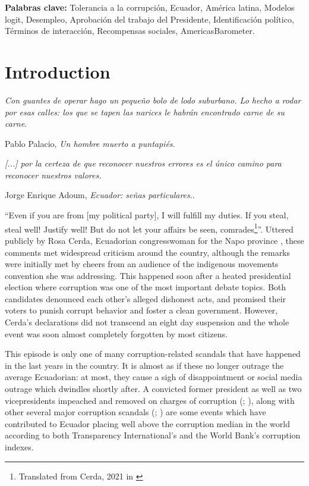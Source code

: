 \documentclass[12pt,a4]{article}\usepackage[]{graphicx}\usepackage[]{xcolor}
\begin{document}
\noindent \textbf{Palabras clave:} Tolerancia a la corrupción, Ecuador, América latina, Modelos logit, Desempleo, Aprobación del trabajo del Presidente, Identificación político, Términos de interacción, Recompensas sociales, AmericasBarometer. 





\section{Introduction}

\epigraph{\textit{Con guantes de operar hago un pequeño bolo de lodo suburbano. Lo hecho a rodar por esas calles: los que se tapen las narices le habrán encontrado carne de su carne}.}{Pablo Palacio, \textit{Un hombre muerto a puntapiés}.} \nocite{Palacio.2018}
\vspace{-0.8cm}
\epigraph{\textit{[...] por la certeza de que reconocer nuestros errores es el único camino para reconocer nuestros valores.}}{Jorge Enrique Adoum, \textit{Ecuador: señas particulares}..}

\enquote{Even if you are from [my political party], I will fulfill my duties. If you steal, steal well!  Justify well! But do not let your affairs be seen, comrades\footnote{Translated from Cerda, 2021 in \cite[para. 2]{PlanV.2021}}}. Uttered publicly by Rosa Cerda, Ecuadorian congresswoman for the Napo province \parencite{Castro.2021}, these comments met widespread criticism around the country, although the remarks were initially met by cheers from an audience of the indigenous movements convention she was addressing. This happened soon after a heated presidential election where corruption was one of the most important debate topics. Both candidates denounced each other's alleged dishonest acts, and promised their voters to punish corrupt behavior and foster a clean government. However, Cerda's declarations did not transcend an eight day suspension \parencite{Ordonez.2021} and the whole event was soon almost completely forgotten by most citizens. 

This episode is only one of many corruption-related scandals that have happened in the last years in the country. It is almost as if these no longer outrage the average Ecuadorian: at most, they cause a sigh of disappointment or social media outrage which dwindles shortly after. A convicted former president as well as two vicepresidents impeached and removed on charges of corruption (\cite{Press.1222018}; \cite{Cabrera.2020}), along with other several major corruption scandals (\cite{BHCompliance.2021}; \cite{Espana.2020}) are some events which have contributed to Ecuador placing well above the corruption median in the world according to both Transparency International's and the World Bank's corruption indexes. 
\end{document}
